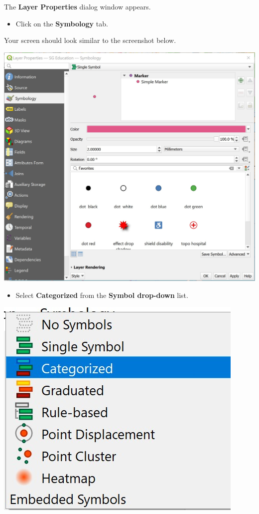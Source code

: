 \documentclass[
  letterpaper,
  DIV=11,
  numbers=noendperiod]{scrreprt}
\providecommand{\tightlist}{%
  \setlength{\itemsep}{0pt}\setlength{\parskip}{0pt}}\usepackage{longtable,booktabs,array}
\begin{document}
The \textbf{Layer Properties} dialog window appears.

\begin{itemize}
\tightlist
\item
  Click on the \textbf{Symbology} tab.
\end{itemize}

Your screen should look similar to the screenshot below.

\includegraphics{./img03/image2.jpg}

\begin{itemize}
\tightlist
\item
  Select \textbf{Categorized} from the \textbf{Symbol drop-down} list.
\end{itemize}

\includegraphics{./img03/image3.jpg}
\end{document}

